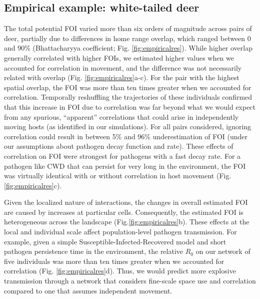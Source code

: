 \documentclass[letterpaper]{article}
\begin{document}
\subsection*{Empirical example: white-tailed deer}

The total potential FOI %
varied more than six orders of magnitude across pairs of deer, partially due to differences in home range overlap, which ranged between 0 and 90\% (Bhattacharyya coefficient; Fig. \ref{fig:empiricalres}). While higher overlap generally correlated with higher FOIs, we estimated higher values when we accounted for correlation in movement, and the difference was not necessarily related with overlap (Fig. \ref{fig:empiricalres}a-c).  For the pair with the highest spatial overlap, the FOI was more than ten times greater when we accounted for correlation. Temporally reshuffling the trajectories of these individuals  \citet[following ][]{Spiegel2016} confirmed that this increase in FOI due to correlation was far beyond what we would expect from any  spurious, ``apparent'' correlations that could arise in independently moving hosts (as identified in our simulations). For all pairs considered, ignoring correlation could result in between 5\% and 96\% underestimation of FOI (under our assumptions about pathogen decay function and rate). These effects of correlation on FOI were strongest for pathogens with a fast decay rate. For a pathogen like CWD that can persist for very long in the environment, the FOI was virtually identical with or without correlation in host movement (Fig. \ref{fig:empiricalres}c). 

Given the localized nature of interactions, the changes in overall estimated FOI are caused by increases at particular cells. Consequently, the estimated FOI is heterogeneous across the landscape (Fig.\ref{fig:empiricalres}b). %
These effects at the local and individual scale affect population-level pathogen transmission. For example, given a simple Susceptible-Infected-Recovered model and short pathogen persistence time in the environment, the relative $R_0$ on our network of five individuals was more than ten times greater when we accounted for correlation (Fig. \ref{fig:empiricalres}d). Thus, we would predict more explosive transmission through a network that considers fine-scale space use and correlation compared to one that assumes independent movement.
\end{document}
